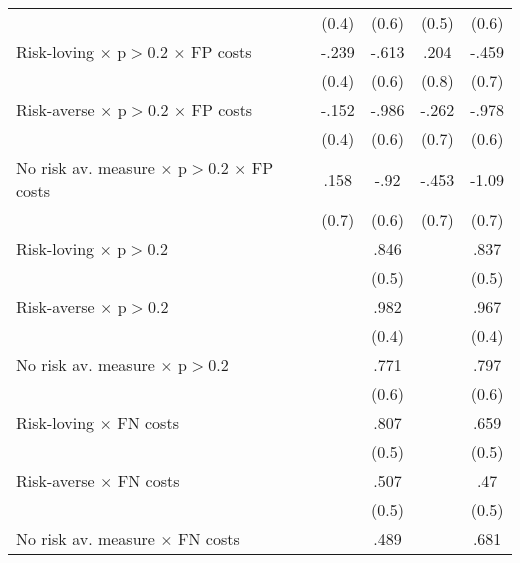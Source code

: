 \begin{table}[htbp]
\begin{tabular}{l*{4}{c}}
                &    (0.4)         &    (0.6)         &    (0.5)         &    (0.6)         \\
Risk-loving $\times$ p$>$0.2 $\times$ FP costs&    -.239         &    -.613         &     .204         &    -.459         \\
                &    (0.4)         &    (0.6)         &    (0.8)         &    (0.7)         \\
Risk-averse $\times$ p$>$0.2 $\times$ FP costs&    -.152         &    -.986         &    -.262         &    -.978         \\
                &    (0.4)         &    (0.6)         &    (0.7)         &    (0.6)         \\
No risk av. measure $\times$ p$>$0.2 $\times$ FP costs&     .158         &     -.92         &    -.453         &    -1.09         \\
                &    (0.7)         &    (0.6)         &    (0.7)         &    (0.7)         \\
Risk-loving $\times$ p$>$0.2&                  &     .846         &                  &     .837         \\
                &                  &    (0.5)         &                  &    (0.5)         \\
Risk-averse $\times$ p$>$0.2&                  &     .982\sym{**} &                  &     .967\sym{**} \\
                &                  &    (0.4)         &                  &    (0.4)         \\
No risk av. measure $\times$ p$>$0.2&                  &     .771         &                  &     .797         \\
                &                  &    (0.6)         &                  &    (0.6)         \\
Risk-loving $\times$ FN costs&                  &     .807         &                  &     .659         \\
                &                  &    (0.5)         &                  &    (0.5)         \\
Risk-averse $\times$ FN costs&                  &     .507         &                  &      .47         \\
                &                  &    (0.5)         &                  &    (0.5)         \\
No risk av. measure $\times$ FN costs&                  &     .489         &                  &     .681         \\

\end{tabular}
\end{table}
